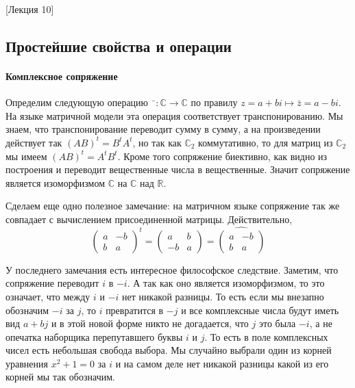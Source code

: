 [Лекция 10]


\subsection{Простейшие свойства и операции}
\label{section::ComplexSimpleProps}

\paragraph{Комплексное сопряжение}

Определим следующую операцию $\bar{\phantom{z}}\colon \mathbb C\to \mathbb C$ по правилу $z = a + bi \mapsto \bar z = a - bi$.
На языке матричной модели эта операция соответствует транспонированию.
Мы знаем, что транспонирование переводит сумму в сумму, а на произведении действует так $(AB)^t = B^t A^t$, но так как $\mathbb C_2$ коммутативно, то для матриц из $\mathbb C_2$ мы имеем $(AB)^t = A^t B^t$.
Кроме того сопряжение биективно, как видно из построения и переводит вещественные числа в вещественные.
Значит сопряжение является изоморфизмом $\mathbb C$ на $\mathbb C$ над $\mathbb R$.

Сделаем еще одно полезное замечание: на матричном языке сопряжение так же совпадает с вычислением присоединенной матрицы.
Действительно,
\[
\begin{pmatrix}
{a}&{-b}\\
{b}&{a}
\end{pmatrix}^t
= 
\begin{pmatrix}
{a}&{b}\\
{-b}&{a}
\end{pmatrix}
=
\widehat{
\begin{pmatrix}
{a}&{-b}\\
{b}&{a}
\end{pmatrix}}
\]

У последнего замечания есть интересное философское следствие.
Заметим, что сопряжение переводит $i$ в $-i$.
А так как оно является изоморфизмом, то это означает, что между $i$ и $-i$ нет никакой разницы.
То есть если мы внезапно обозначим $-i$ за $j$, то $i$ превратится в $-j$ и все комплексные числа будут иметь вид $a + bj$ и в этой новой форме никто не догадается, что $j$ это была $-i$, а не опечатка наборщика перепутавшего буквы $i$ и $j$.
То есть в поле комплексных чисел есть небольшая свобода выбора.
Мы случайно выбрали один из корней уравнения $x^2 + 1 = 0$ за $i$ и на самом деле нет никакой разницы какой из его корней мы так обозначим.

